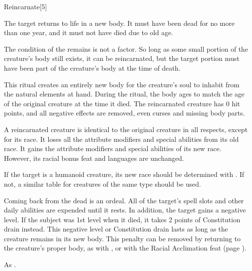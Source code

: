 \begin{spellsection}{Reincarnate}[5]
    \begin{spellheader}
    \end{spellheader}
    \begin{spellcontent}
        \begin{spelltargetinginfo}
        \end{spelltargetinginfo}
        \begin{spelleffects}

            \spelleffect The target returns to life in a new body. It must have been dead for no more than one year, and it must not have died due to old age.

            The condition of the remains is not a factor. So long as some small portion of the creature's body still exists, it can be reincarnated, but the target portion must have been part of the creature's body at the time of death.

            This ritual creates an entirely new body for the creature's soul to inhabit from the natural elements at hand. During the ritual, the body ages to match the age of the original creature at the time it died. The reincarnated creature has 0 hit points, and all negative effects are removed, even curses and missing body parts.

            A reincarnated creature is identical to the original creature in all respects, except for its race. It loses all the attribute modifiers and special abilities from its old race. It gains the attribute modifiers and special abilities of its new race. However, its racial bonus feat and languages are unchanged.

            If the target is a humanoid creature, its new race should be determined with . If not, a similar table for creatures of the same type should be used.

            Coming back from the dead is an ordeal. All of the target's spell slots and other daily abilities are expended until it rests. In addition, the target gains a negative level. If the subject was 1st level when it died, it takes 2 points of Constitution drain instead. This negative level or Constitution drain lasts as long as the creature remains in its new body. This penalty can be removed by returning to the creature's proper body, as with , or with the Racial Acclimation feat (page ).

        \end{spelleffects}
    \end{spellcontent}
    \begin{spellfooter}
        \spellnotes As .
    \end{spellfooter}
\end{spellsection}
